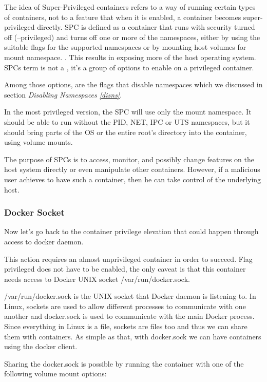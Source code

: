 \begin{description}[style=nextline]
The idea of Super-Privileged containers refers to a way of running certain types of containers, not to a feature that when it is enabled, a container becomes super-privileged directly. SPC is defined as a container that runs with security turned off (--privileged) and turns off one or more of the namespaces, either by using the suitable flags for the supported namespaces or by mounting host volumes for mount namespace. \cite{spcbydanwalsh}. This results in exposing more of the host operating system.
SPCs term is not a , it's a group of options to enable on a privileged container. 

Among those options, are the flags that disable namespaces which we discussed in section \textit{Disabling Namespaces \ref{disns}}.

In the most privileged version, the SPC will use only the mount namespace. It should be able to run without the PID, NET, IPC or UTS namespaces, but it should bring parts of the OS or the entire root's directory into the container, using volume mounts.

The purpose of SPCs is to access, monitor, and possibly change features on the host system directly or even manipulate other containers. However, if a malicious user achieves to have such a container, then he can take control of the underlying host.
\end{description}

\subsubsection{Docker Socket}
Now let's go back to the container privilege elevation that could happen through access to docker daemon.

This action requires an almost unprivileged container in order to succeed. Flag privileged does not have to be enabled, the only caveat is that this container needs access to Docker UNIX socket /var/run/docker.sock.

/var/run/docker.sock is the UNIX socket that Docker daemon is listening to. In Linux, sockets are used to allow different processes to communicate with one another and docker.sock is used to communicate with the main Docker process. Since everything in Linux is a file, sockets are files too and thus we can share them with containers. As simple as that, with docker.sock we can have containers using the docker client.

Sharing the docker.sock is possible by running the container with one of the following volume mount options:

